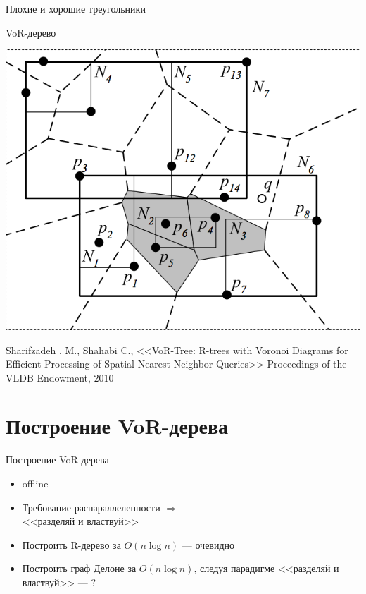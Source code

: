 \documentclass[14pt, fleqn, xcolor={dvipsnames, table}]{beamer}
\begin{document}
\begin{frame}{Плохие и хорошие треугольники}
\begin{center}
	        \end{center}       
        \end{frame}
        
        \begin{frame}{VoR-дерево}
            \begin{center}
	            \includegraphics[scale = 0.3]{vor-tree.png}
	            
	            {\tiny Sharifzadeh , M., Shahabi C., <<VoR-Tree: R-trees with Voronoi Diagrams for Efficient Processing of Spatial Nearest Neighbor Queries>> Proceedings of the VLDB Endowment, 2010}	  
	        \end{center}   
        \end{frame}
        
    \section{Построение VoR-дерева}    
    
        \begin{frame}{Построение VoR-дерева}
            \begin{itemize}
                \item offline
                \item Требование распараллеленности $\Longrightarrow$ \\ <<разделяй и властвуй>> 
                \item Построить R-дерево за $O(n \log n)$ --- очевидно
                \item Построить граф Делоне за $O(n \log n)$, следуя парадигме <<разделяй и властвуй>> --- ?
            \end{itemize}
        \end{frame}
        
\end{document}
